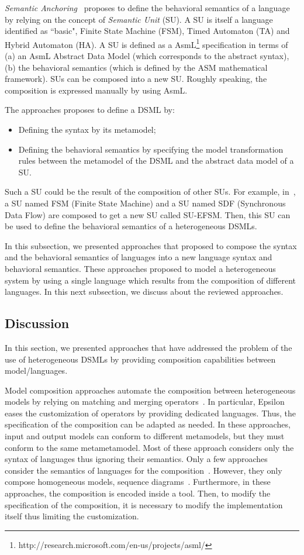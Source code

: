 \emph{Semantic Anchoring}~\cite{semanticsanchoring} proposes to define the behavioral semantics of a language by relying on the concept of \emph{Semantic Unit} (SU). A SU is itself a language identified as ``basic", \eg Finite State Machine (FSM), Timed Automaton (TA) and Hybrid Automaton (HA). A SU is defined as a AsmL\footnote{http://research.microsoft.com/en-us/projects/asml/} specification in terms of (a) an AsmL Abstract Data Model (which corresponds to the abstract syntax), (b) the behavioral semantics (which is defined by the ASM mathematical framework).  SUs can be composed into a new SU. Roughly speaking, the composition is expressed manually by using AsmL. 

The approaches proposes to define a DSML by:
\begin{itemize}
	\item Defining the syntax by its metamodel; 
	\item Defining the behavioral semantics by specifying the model transformation rules between the metamodel of the DSML and the abstract data model of a SU.   
\end{itemize}
Such a SU could be the result of the composition of other SUs. For example, in~\cite{composemanticanch}, a SU named FSM (Finite State Machine) and a SU named SDF (Synchronous Data Flow) are composed to get a new SU called SU-EFSM. Then, this SU can be used to define the behavioral semantics of a heterogeneous DSMLs.

In this subsection, we presented approaches that proposed to compose the syntax and the behavioral semantics of languages into a new language syntax and behavioral semantics. These approaches proposed to model a heterogeneous system by using a single language which results from the composition of different languages. In this next subsection, we discuss about the reviewed approaches.

\subsection{Discussion}
In this section, we presented approaches that have addressed the problem of the use of heterogeneous DSMLs by providing composition capabilities between model/languages.

Model composition approaches automate the composition between heterogeneous models by relying on matching and merging operators~\cite{mergemanifest,epsilon,kompose}. In particular, Epsilon~\cite{epsilon} eases the customization of operators by providing dedicated languages. Thus, the specification of the composition can be adapted as needed. In these approaches, input and output models can conform to different metamodels, but they must conform to the same metametamodel. Most of these approach considers only the syntax of languages thus ignoring their semantics. Only a few approaches consider the semantics of languages for the composition~\cite{sequenceweavingbib,rambib,composdbib}. However, they only compose homogeneous models, \ie sequence diagrams~\cite{rambib}. Furthermore, in these approaches, the composition is encoded inside a tool. Then, to modify the specification of the composition, it is necessary to modify the implementation itself thus limiting the customization. 

